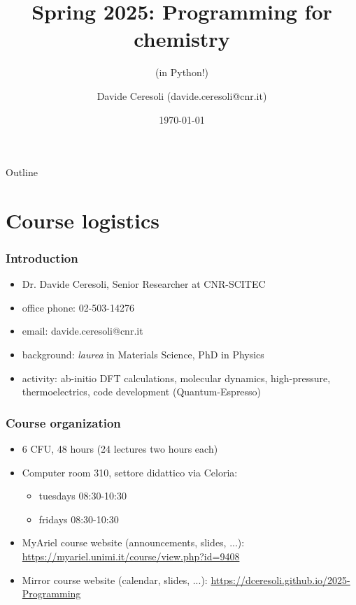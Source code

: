 \documentclass[handout]{beamer}
\title[Prog4Chem]{Spring 2025: Programming for chemistry}
\subtitle{(in Python!)}
\author[Davide Ceresoli]{Davide Ceresoli (davide.ceresoli@cnr.it)}
\date{\today}
\institute[CNR-SCITEC]{Instituto di Scienze e Tecnologie Chimiche ``G. Natta'' (CNR-SCITEC)}
\begin{document}
\begin{frame}
\titlepage
\end{frame}

\begin{frame}{Outline}
\tableofcontents
\end{frame}



\section{Course logistics}
\begin{frame}[fragile]
  \frametitle{Introduction}
  \begin{itemize}
  \item Dr. Davide Ceresoli, Senior Researcher at CNR-SCITEC
  \item office phone: 02-503-14276
  \item email: davide.ceresoli@cnr.it 
  \item background: \emph{laurea} in Materials Science, PhD in Physics
  \item activity: ab-initio DFT calculations, molecular dynamics, high-pressure, thermoelectrics, code development (Quantum-Espresso)  
  \end{itemize}
\end{frame}

\begin{frame}[fragile]
  \frametitle{Course organization}
  \begin{itemize}
  \item 6 CFU, 48 hours (24 lectures two hours each)
  \item Computer room 310, settore didattico via Celoria:
        \begin{itemize}
        \item tuesdays 08:30-10:30
        \item fridays 08:30-10:30
        \end{itemize}
  \item MyAriel course website (announcements, slides, ...): \url{https://myariel.unimi.it/course/view.php?id=9408}
  \item Mirror course website (calendar, slides, ...): \url{https://dceresoli.github.io/2025-Programming}
  \end{itemize}
\end{frame}
\end{document}

